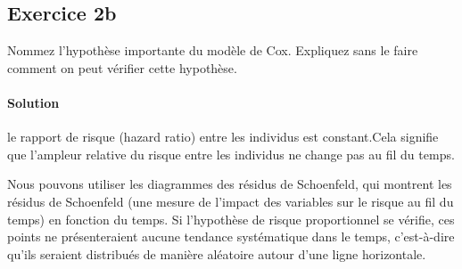 \documentclass[../main.tex]{subfiles}
\begin{document}
\begin{CJK*}{UTF8}{gbsn}
    
\section*{Exercice 2b}
Nommez l'hypothèse importante du modèle de Cox. 
Expliquez sans le faire comment on peut vérifier cette hypothèse.
    
\paragraph{Solution}

le rapport de risque (hazard ratio) entre les individus est constant.Cela signifie que l'ampleur relative du risque entre les individus ne change pas au fil du temps.
    
Nous pouvons utiliser les diagrammes des résidus de Schoenfeld, 
qui montrent les résidus de Schoenfeld 
(une mesure de l'impact des variables sur le risque au fil du temps) 
en fonction du temps. Si l'hypothèse de risque proportionnel se vérifie, 
ces points ne présenteraient aucune tendance systématique dans le temps, 
c'est-à-dire qu'ils seraient distribués de manière aléatoire autour d'une ligne horizontale.

\end{CJK*}
\end{document}
